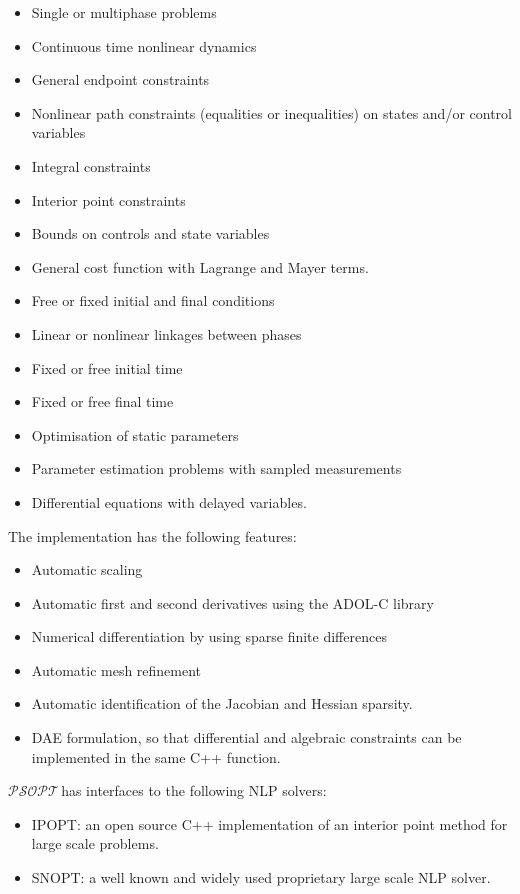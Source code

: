 \documentclass[a4paper,11pt]{report}    %
\newcommand{\psopt}{$\mathcal{PSOPT}$\,}  %
\begin{document}
\begin{itemize}
 \item Single or multiphase problems
 \item Continuous time nonlinear dynamics
 \item General endpoint constraints
 \item Nonlinear path constraints (equalities or inequalities) on states and/or control variables
 \item Integral constraints
 \item Interior point constraints
 \item Bounds on controls and state variables
 \item General cost function with Lagrange and Mayer terms.
 \item Free or fixed initial and final conditions
 \item Linear or nonlinear linkages between phases
 \item Fixed or free initial time
 \item Fixed or free final time
 \item Optimisation of static parameters
 \item Parameter estimation problems with sampled measurements
 \item Differential equations with delayed variables.
\end{itemize}

The implementation has the following features:

\begin{itemize}
 \item Automatic scaling
 \item Automatic first and second derivatives using the ADOL-C library
 \item Numerical differentiation by using sparse finite differences
 \item Automatic mesh refinement
 \item Automatic identification of the Jacobian and Hessian sparsity.
 \item DAE formulation, so that differential and algebraic constraints 
       can be implemented in the same C++ function.
\end{itemize}

\psopt has interfaces to the following NLP solvers:

\begin{itemize}
 \item IPOPT: an open source C++ implementation of an interior point method for large scale problems.
 \item SNOPT: a well known and widely used proprietary large scale NLP solver.
\end{itemize}
\end{document}
